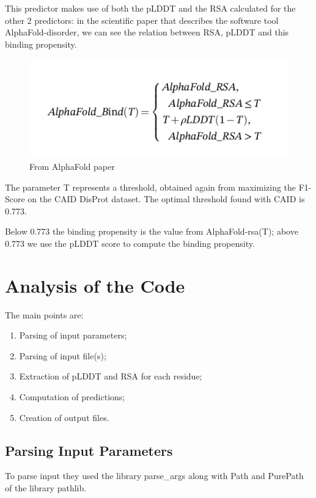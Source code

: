 This predictor makes use of both the pLDDT and the RSA calculated for the other 2 predictors: in the scientific paper \cite{alphafold-disorder} that describes the software tool AlphaFold-disorder, we can see the relation between RSA, pLDDT and this binding propensity.
\begin{figure}
    \centering
    \includegraphics[scale=.7]{res/alphafold-binding.png}
    \caption{From AlphaFold paper \cite{alphafold-disorder}}
    \label{fig:enter-label}
\end{figure}


The parameter T represents a threshold, obtained again from maximizing the F1-Score on the CAID DisProt dataset. The optimal threshold found with CAID is 0.773. 

Below 0.773 the binding propensity is the value from AlphaFold-rsa(T); above 0.773 we use the pLDDT score to compute the binding propensity.

\section{Analysis of the Code}
The main points are: 
\begin{enumerate}

    \item Parsing of input parameters;
    \item Parsing of input file(s);
    \item Extraction of pLDDT and RSA for each residue;
    \item Computation of predictions;
    \item Creation of output files.
\end{enumerate}

\pagebreak

\subsection{Parsing Input Parameters}
To parse input they used the library parse\_args along with Path and PurePath of the library pathlib.

